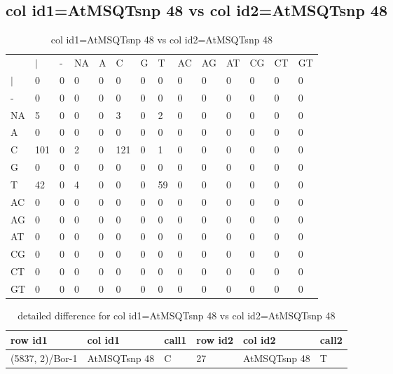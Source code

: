 \subsection{col id1=AtMSQTsnp 48 vs col id2=AtMSQTsnp 48}
\begin{center}
\begin{longtable}{|l|l|l|l|l|l|l|l|l|l|l|l|l|l|}
\caption{col id1=AtMSQTsnp 48 vs col id2=AtMSQTsnp 48} \label{table_dm932}\\
\hline
\\
\hline
&$|$&-&NA&A&C&G&T&AC&AG&AT&CG&CT&GT\\
$|$&0&0&0&0&0&0&0&0&0&0&0&0&0\\
-&0&0&0&0&0&0&0&0&0&0&0&0&0\\
NA&5&0&0&0&3&0&2&0&0&0&0&0&0\\
A&0&0&0&0&0&0&0&0&0&0&0&0&0\\
C&101&0&2&0&121&0&1&0&0&0&0&0&0\\
G&0&0&0&0&0&0&0&0&0&0&0&0&0\\
T&42&0&4&0&0&0&59&0&0&0&0&0&0\\
AC&0&0&0&0&0&0&0&0&0&0&0&0&0\\
AG&0&0&0&0&0&0&0&0&0&0&0&0&0\\
AT&0&0&0&0&0&0&0&0&0&0&0&0&0\\
CG&0&0&0&0&0&0&0&0&0&0&0&0&0\\
CT&0&0&0&0&0&0&0&0&0&0&0&0&0\\
GT&0&0&0&0&0&0&0&0&0&0&0&0&0\\
\hline
\end{longtable}
\end{center}

\begin{center}
\begin{longtable}{|l|l|l|l|l|l|}
\caption{detailed difference for col id1=AtMSQTsnp 48 vs col id2=AtMSQTsnp 48} \label{table_dm933}\\
\hline
row id1&col id1&call1&row id2&col id2&call2\\
\hline
(5837, 2)/Bor-1&AtMSQTsnp 48&C&27&AtMSQTsnp 48&T\\
\hline
\end{longtable}
\end{center}

